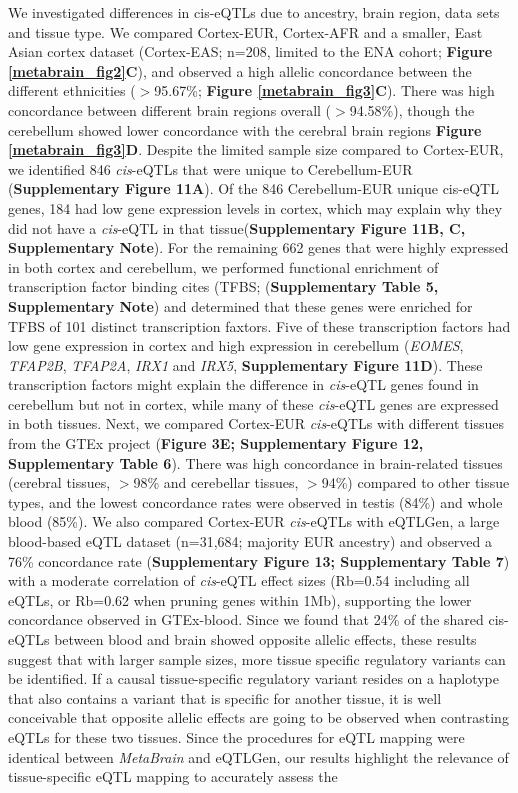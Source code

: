 We investigated differences in cis-eQTLs due to ancestry, brain region, data sets and tissue type. We compared Cortex-EUR, Cortex-AFR and a smaller, East Asian cortex dataset (Cortex-EAS; n=208, limited to the ENA cohort; \textbf{Figure \ref{metabrain_fig2}C}), and observed a high allelic concordance between the different ethnicities ($>$95.67\%; \textbf{Figure \ref{metabrain_fig3}C}). There was high concordance between different brain regions overall ($>$94.58\%), though the cerebellum showed lower concordance with the cerebral brain regions \textbf{Figure \ref{metabrain_fig3}D}. Despite the limited sample size compared to Cortex-EUR, we identified 846 \textit{cis}-eQTLs that were unique to Cerebellum-EUR (\textbf{Supplementary Figure 11A}). Of the 846 Cerebellum-EUR unique cis-eQTL genes, 184 had low gene expression levels in cortex, which may explain why they did not have a \textit{cis}-eQTL in that tissue(\textbf{Supplementary Figure 11B, C, Supplementary Note}). For the remaining 662 genes that were highly expressed in both cortex and cerebellum, we performed functional enrichment of transcription factor binding cites (TFBS; (\textbf{Supplementary Table 5, Supplementary Note}) and determined that these genes were enriched for TFBS of 101 distinct transcription faxtors. Five of these transcription factors had low gene expression in cortex  and high expression in cerebellum (\textit{EOMES}, \textit{TFAP2B}, \textit{TFAP2A}, \textit{IRX1} and \textit{IRX5}, \textbf{Supplementary Figure 11D}). These transcription factors might explain the difference in \textit{cis}-eQTL genes found in cerebellum but not in cortex, while many of these \textit{cis}-eQTL genes are expressed in both tissues. Next, we compared Cortex-EUR \textit{cis}-eQTLs with different tissues from the GTEx project (\textbf{Figure 3E; Supplementary Figure 12, Supplementary Table 6}). There was high concordance in brain-related tissues (cerebral tissues, $>$98\% and cerebellar tissues, $>$94\%) compared to other tissue types, and the lowest concordance rates were observed in testis (84\%) and whole blood (85\%). We also compared Cortex-EUR \textit{cis}-eQTLs with eQTLGen\cite{vosaUnravelingPolygenicArchitecture2018}, a large blood-based eQTL dataset (n=31,684; majority EUR ancestry) and observed a 76\% concordance rate (\textbf{Supplementary Figure 13; Supplementary Table 7}) with a moderate correlation of \textit{cis}-eQTL effect sizes (Rb=0.54 including all eQTLs, or Rb=0.62 when pruning genes within 1Mb)\cite{foleyFastEfficientColocalization2021}, supporting the lower concordance observed in GTEx-blood. Since we found that 24\% of the shared cis-eQTLs between blood and brain showed opposite allelic effects, these results suggest that with larger sample sizes, more tissue specific regulatory variants can be identified. If a causal tissue-specific regulatory variant resides on a haplotype that also contains a variant that is specific for another tissue, it is well conceivable that opposite allelic effects are going to be observed when contrasting eQTLs for these two tissues\cite{fuUnravelingRegulatoryMechanisms2012}. Since the procedures for eQTL mapping were identical between \textit{MetaBrain} and eQTLGen, our results highlight the relevance of tissue-specific eQTL mapping to accurately assess the 